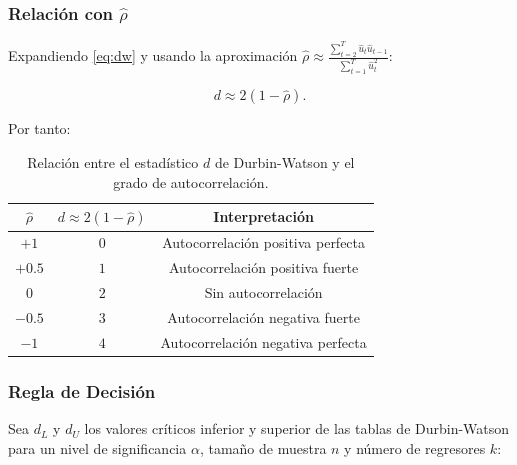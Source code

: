 \documentclass[12pt,a4paper]{article}
\theoremstyle{definition}
\theoremstyle{remark}
\begin{document}
\subsubsection{Relación con $\hat\rho$}

Expandiendo \eqref{eq:dw} y usando la aproximación
$\hat\rho \approx \frac{\sum_{t=2}^T \hat u_t \hat u_{t-1}}
                       {\sum_{t=1}^T \hat u_t^2}$:

\begin{equation}
  d \approx 2(1 - \hat\rho).
  \label{eq:dw-rho}
\end{equation}

Por tanto:

\begin{table}[H]
  \centering
  \caption{Relación entre el estadístico $d$ de Durbin-Watson y
           el grado de autocorrelación.}
  \label{tab:dw-valores}
  \begin{tabular}{ccc}
    \toprule
    $\hat\rho$ & $d \approx 2(1-\hat\rho)$ & Interpretación \\
    \midrule
    $+1$       & $0$                        & Autocorrelación positiva perfecta \\
    $+0.5$     & $1$                        & Autocorrelación positiva fuerte \\
    $0$        & $2$                        & Sin autocorrelación \\
    $-0.5$     & $3$                        & Autocorrelación negativa fuerte \\
    $-1$       & $4$                        & Autocorrelación negativa perfecta \\
    \bottomrule
  \end{tabular}
\end{table}

\subsubsection{Regla de Decisión}

Sea $d_L$ y $d_U$ los valores críticos inferior y superior de las
tablas de Durbin-Watson para un nivel de significancia $\alpha$,
tamaño de muestra $n$ y número de regresores $k$:
\end{document}
